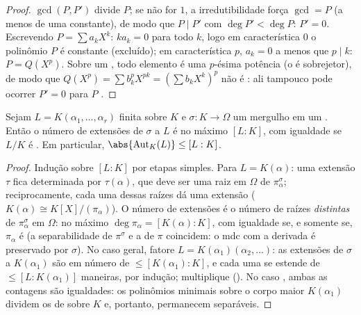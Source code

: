 \begin{proof}
$\gcd(P, P')$ divide $P$; se não for $1$, a irredutibilidade força
$\gcd = P$ (a menos de uma constante), de modo que $P \mid P'$ com $\deg
P' < \deg P$:
$P' = 0$. Escrevendo $P = \sum a_kX^k$: $ka_k = 0$ para todo $k$, logo em
característica $0$ o polinômio $P$ é constante (excluído); em
característica $p$, $a_k = 0$ a menos que $p \mid k$: $P =
Q(X^p)$. Sobre um , todo elemento é uma $p$-ésima potência (o  é
sobrejetor), de modo que $Q(X^p) = \sum b_k^p X^{pk} = (\sum
b_kX^k)^p$ não é : ali tampouco pode
ocorrer $P' = 0$ para $P$ .
\end{proof}

\begin{proposition}\label{prop:b3:galois:embeddings}
Sejam $L = K(\alpha_1, \dots, \alpha_r)$ finita sobre $K$ e $\sigma \colon K \to \Omega$ um mergulho em um . Então o número de extensões de $\sigma$ a
$L$ é no máximo $[L:K]$, com igualdade se $L/K$ é .
Em particular, $\abs{\operatorname{Aut}_K(L)} \leq [L:K]$.
\end{proposition}

\begin{proof}
Indução sobre $[L:K]$ por etapas simples. Para $L = K(\alpha)$: uma extensão
$\tau$ fica determinada por $\tau(\alpha)$, que deve ser uma raiz em
$\Omega$ de $\pi_\alpha^\sigma$; reciprocamente, cada uma dessas raízes dá uma
extensão ($K(\alpha) \cong K[X]/(\pi_\alpha)$). O número de extensões é o número de raízes
\emph{distintas} de $\pi_\alpha^\sigma$ em $\Omega$: no máximo $\deg\pi_\alpha =
[K(\alpha):K]$, com
igualdade se, e somente se, $\pi_\alpha$ é  (a separabilidade de
$\pi^\sigma$ e a de $\pi$ coincidem: o mdc com a derivada é preservado por
$\sigma$). No caso geral, fatore $L =
K(\alpha_1)(\alpha_2, \dots)$: as extensões de
$\sigma$ a $K(\alpha_1)$ são em número de $\leq [K(\alpha_1):K]$, e cada uma se estende de
$\leq [L : K(\alpha_1)]$ maneiras, por indução; multiplique (). No caso
, ambas as contagens são igualdades: os polinômios minimais
sobre o corpo maior $K(\alpha_1)$ dividem os de sobre $K$ e, portanto,
permanecem separáveis.
\end{proof}

